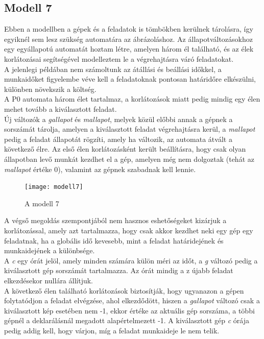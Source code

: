 \documentclass [12pt]{report}
\begin{document}
\subsection{Modell 7}
Ebben a modellben a gépek és a feladatok is tömbökben kerülnek tárolásra, így egyiknél sem lesz szükség automatára az ábrázoláshoz. Az állapotváltozásokhoz egy egyállapotú automatát hoztam létre, amelyen három él található, és az élek korlátozásai segítségével modelleztem le a végrehajtásra váró feladatokat. \\
A jelenlegi példában nem számoltunk az átállási és beállási időkkel, a munkaidőket figyelembe véve kell a feladatoknak pontosan határidőre elkészülni, különben növekszik a költség.\\
A P0 automata három élet tartalmaz, a korlátozások miatt pedig mindig egy élen mehet tovább a kiválasztott feladat.\\
Új változók a \emph{gallapot} és \emph{mallapot}, melyek közül előbbi annak a gépnek a sorszámát tárolja, amelyen a kiválasztott feladat végrehajtásra kerül, a \emph{mallapot} pedig a feladat állapotát rögzíti, amely ha változik, az automata átvált a következő élre. Az első élen korlátozásként került beállításra, hogy csak olyan állapotban levő munkát kezdhet el a gép, amelyen még nem dolgoztak (tehát az \emph{mallapot} értéke 0), valamint az gépnek szabadnak kell lennie.\\
\begin{figure}[htpb]
\begin{center}
\texttt{[image: modell7]}
\caption{A modell 7}
\end{center}
\end{figure}
A végső megoldás szempontjából nem hasznos eshetőségeket kizárjuk a korlátozással, amely azt tartalmazza, hogy csak akkor kezdhet neki egy gép egy feladatnak, ha a globális idő kevesebb, mint a feladat határidejének és munkaidejének a különbsége. \\
A \emph{c} egy órát jelöl, amely minden számára külön méri az időt, a \emph{g} változó pedig a kiválasztott gép sorszámát tartalmazza. Az órát mindig a z újabb feladat elkezdésekor nullára állítjuk.\\
A  következő élen található korlátozások biztosítják, hogy ugyanazon a gépen folytatódjon a feladat elvégzése, ahol elkezdődött, hiszen a \emph{gallapot} változó csak a kiválasztott kép esetében nem -1, ekkor értéke az aktuális gép sorszáma, a többi gépnél a deklarálásnál megadott alapértelmezett -1. A kiválasztott gép \emph{c} órája pedig addig kell, hogy várjon, míg a feladat munkaideje le nem telik. \\
\end{document}
